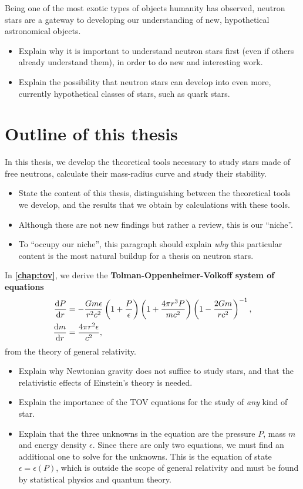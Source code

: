 Being one of the most exotic types of objects humanity has observed, neutron stars are a gateway to developing our understanding of new, hypothetical astronomical objects.
\begin{itemize}
\item Explain why it is important to understand neutron stars first (even if others already understand them), in order to do new and interesting work.
\item Explain the possibility that neutron stars can develop into even more, currently hypothetical classes of stars, such as quark stars.
\end{itemize}

\section{Outline of this thesis}

In this thesis, we develop the theoretical tools necessary to study stars made of free neutrons, calculate their mass-radius curve and study their stability.
\begin{itemize}
\item State the content of this thesis, distinguishing between the theoretical tools we develop, and the results that we obtain by calculations with these tools.
\item Although these are not new findings but rather a review, this is our ``niche''.
\item To ``occupy our niche'', this paragraph should explain \emph{why} this particular content is the most natural buildup for a thesis on neutron stars.
\end{itemize}

In \textbf{\cref{chap:tov}}, we derive the \textbf{Tolman-Oppenheimer-Volkoff system of equations}
\begin{align*}
	\odv{P}{r} &= -\frac{G m \epsilon}{r^2 c^2} \left( 1 + \frac{P}{\epsilon} \right) \left( 1 + \frac{4 \pi r^3 P}{m c^2} \right) \left( 1 - \frac{2 G m}{r c^2} \right)^{-1} , \\
	\odv{m}{r} &= \frac{4 \pi r^2 \epsilon}{c^2} ,
\end{align*}
from the theory of general relativity.
\begin{itemize}
\item Explain why Newtonian gravity does not suffice to study stars, and that the relativistic effects of Einstein's theory is needed.
\item Explain the importance of the TOV equations for the study of \emph{any} kind of star.
\item Explain that the three unknowns in the equation are the pressure $P$, mass $m$ and energy density $\epsilon$.
      Since there are only two equations, we must find an additional one to solve for the unknowns.
      This is the equation of state $\epsilon = \epsilon(P)$, which is outside the scope of general relativity and must be found by statistical physics and quantum theory.
\end{itemize}

